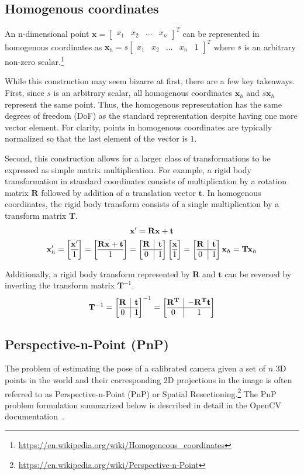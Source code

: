 \documentclass{article}
\makeatletter
\newcommand{\twobytwo}[4]{\ensuremath{\left[\begin{array}{@{}c|c@{}} #1 & #2 \\ \hline #3 & #4 \end{array}\right]}}
\newcommand{\twobyone}[2]{\ensuremath{\left[\begin{array}{@{}c@{}} #1 \\ \hline #2 \end{array}\right]}}
\makeatother
\begin{document}
\subsection{Homogenous coordinates}
An n-dimensional point $\mathbf{x} = \begin{bmatrix}x_1 & x_2 & \dots & x_n\end{bmatrix}^T$ can be represented in homogenous coordinates as $\mathbf{x}_h = s\begin{bmatrix}x_1 & x_2 & \dots & x_n & 1\end{bmatrix}^T$ where $s$ is an arbitrary non-zero scalar.\footnote{\url{https://en.wikipedia.org/wiki/Homogeneous_coordinates}}

While this construction may seem bizarre at first, there are a few key takeaways. First, since $s$ is an arbitrary scalar, all homogenous coordinates $\mathbf{x}_h$ and $s\mathbf{x}_h$ represent the same point. Thus, the homogenous representation has the same degrees of freedom (DoF) as the standard representation despite having one more vector element. For clarity, points in homogenous coordinates are typically normalized so that the last element of the vector is $1$.

Second, this construction allows for a larger class of transformations to be expressed as simple matrix multiplication. For example, a rigid body transformation in standard coordinates consists of multiplication by a rotation matrix $\mathbf{R}$ followed by addition of a translation vector $\mathbf{t}$. In homogenous coordinates, the rigid body transform consists of a single multiplication by a transform matrix $\mathbf{T}$. 
\begin{gather*}
    \mathbf{x}' = \mathbf{Rx} + \mathbf{t} \\
    \mathbf{x}'_h =  \twobyone{\mathbf{x}'}{1} =  \twobyone{\mathbf{Rx} + \mathbf{t}}{1} = \twobytwo{\mathbf{R}}{\mathbf{t}}{0}{1} \twobyone{\mathbf{x}}{1} =  \twobytwo{\mathbf{R}}{\mathbf{t}}{0}{1} \mathbf{x}_h = \mathbf{Tx}_h
\end{gather*}

Additionally, a rigid body transform represented by $\mathbf{R}$ and $\mathbf{t}$ can be reversed by inverting the transform matrix $\mathbf{T}^{-1}$.
\begin{gather*}
    \mathbf{T}^{-1} = \twobytwo{\mathbf{R}}{\mathbf{t}}{0}{1} ^ {-1} = \twobytwo{\mathbf{R^T}}{\mathbf{-R^T t}}{0}{1}
\end{gather*}

\subsection{Perspective-n-Point (PnP)}
\label{section:pnp}
The problem of estimating the pose of a calibrated camera given a set of $n$ 3D points in the world and their corresponding 2D projections in the image is often referred to as Perspective-n-Point (PnP) or Spatial Resectioning.\footnote{\url{https://en.wikipedia.org/wiki/Perspective-n-Point}} The PnP problem formulation summarized below is described in detail in the OpenCV documentation~\cite{opencv_calib3d}.
\end{document}

